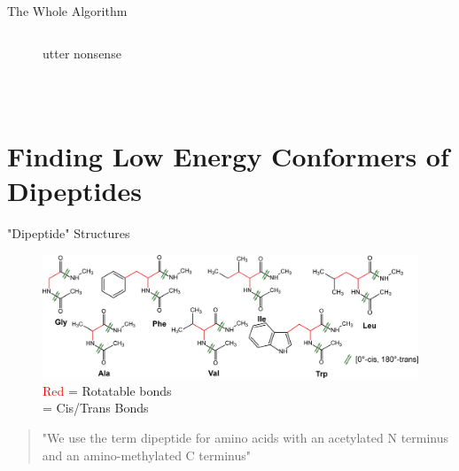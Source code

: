 \documentclass[10pt]{beamer}
\begin{document}
{{\begin{frame}{The Whole Algorithm}
\begin{columns}[c]
\begin{column}{0.6\textwidth}
\begin{itemize}
{{\begin{figure}
					    \caption*{utter nonsense}
					\end{figure}
				}}
			\end{itemize}
		\end{column}
	\end{columns}
	~
\end{frame}

\section{Finding Low Energy Conformers of Dipeptides}

{%
\begin{frame}{"Dipeptide" Structures}
   	\begin{figure}
   		\includegraphics[width=\linewidth]{images/Supady2.png}
   		\caption*{\textcolor{red}{Red} = Rotatable bonds \\
		   		  \textbf{\textcolor{darkgreen}{\ce{<=>}}} = Cis/Trans Bonds
		   		  }
   	\end{figure}
   	\begin{quote}
       	"We use the term dipeptide for amino acids with an acetylated 
       	N terminus and an amino-methylated C terminus"
    \end{quote}
\end{frame}
}

}}
\end{document}
